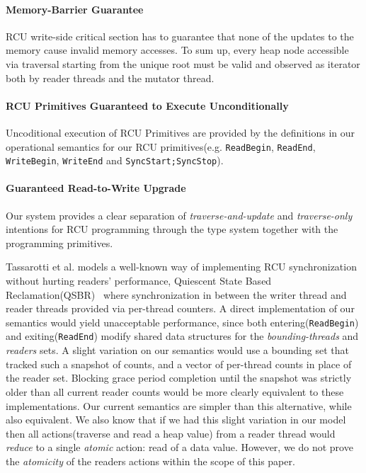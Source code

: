 \paragraph{Memory-Barrier Guarantee} RCU write-side critical section has to guarantee that none of the updates to the memory cause invalid memory accesses. To sum up, every heap node accessible via traversal starting from the unique root must be valid and observed as \textsf{iterator} both by reader threads and the mutator thread.

\paragraph{RCU Primitives Guaranteed to Execute Unconditionally} Uncoditional execution of RCU Primitives are provided by the definitions in our operational semantics for our RCU primitives(e.g. \lstinline|ReadBegin|, \lstinline|ReadEnd|, \lstinline|WriteBegin|, \lstinline|WriteEnd| and \lstinline|SyncStart;SyncStop|).

\paragraph{Guaranteed Read-to-Write Upgrade} Our system provides a clear separation of \textit{traverse-and-update} and \textit{traverse-only} intentions for \textsf{RCU} programming through the type system together with the programming primitives.

 Tassarotti et al. models a well-known way of implementing RCU synchronization without hurting readers' performance, \textsf{Quiescent State Based Reclamation}(QSBR)~\cite{urcu_ieee} where synchronization in between the writer thread and reader threads provided via per-thread counters. A direct implementation of our semantics would yield unacceptable performance, since both entering(\lstinline|ReadBegin|) and exiting(\lstinline|ReadEnd|) modify shared data structures for the \textit{bounding-threads} and \textit{readers} sets. A slight variation on our semantics would use a bounding set  that tracked such a snapshot of counts, and a vector of per-thread counts in place of the reader set. Blocking grace period completion until the snapshot was strictly older than all current reader counts would be more clearly equivalent to these implementations. Our current semantics are simpler than this alternative, while also equivalent. We also know that if we had this slight variation in our model then all actions(traverse and read a heap value) from a reader thread would \textit{reduce} to a single \textit{atomic} action: read of a data value. However, we do not prove the \textit{atomicity} of the readers actions within the scope of this paper.

